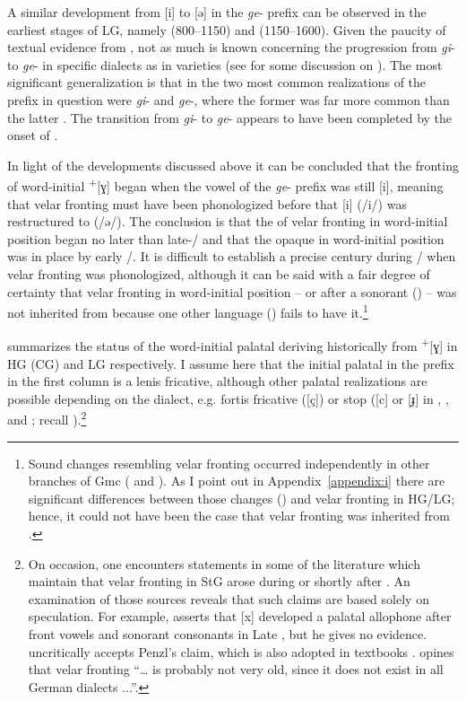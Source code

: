 A similar development from [i] to [ə] in the \textit{ge}{}- prefix can be observed in the earliest stages of LG, namely  (800--1150) and  (1150--1600). Given the paucity of textual evidence from , not as much is known concerning the progression from \textit{gi}{}- to \textit{ge}{}- in specific  dialects as in  varieties (see \citealt{King1965} for some discussion on ). The most significant generalization is that in  the two most common realizations of the prefix in question were \textit{gi}{}- and \textit{ge}{}-, where the former was far more common than the latter \citep[42]{Holthausen1900}. The transition from \textit{gi}{}- to \textit{ge}{}- appears to have been completed by the onset of  \citep[125]{Lasch1914}.

In light of the developments discussed above it can be concluded that the fronting of word-initial  \textsuperscript{+}[ɣ] began when the vowel of the \textit{ge}{}- prefix was still [i], meaning that velar fronting must have been phonologized before that [i] (/i/) was restructured to  (/ə/). The conclusion is that the  of velar fronting in word-initial position began no later than late-/ and that the opaque in word-initial position was in place by early /. It is difficult to establish a precise century during / when velar fronting was phonologized, although it can be said with a fair degree of certainty that velar fronting in word-initial position -- or after a sonorant () -- was not inherited from  because one other  language () fails to have it.\footnote{{Sound changes resembling velar fronting occurred independently in other branches of Gmc ( and ). As I point out in Appendix~\ref{appendix:i} there are significant differences between those changes () and velar fronting in HG/LG; hence, it could not have been the case that velar fronting was inherited from .}}

 summarizes the status of the word-initial palatal deriving historically from  \textsuperscript{+}[ɣ] in HG (CG) and LG respectively. I assume here that the initial palatal in the prefix in the first column is a lenis fricative, although other palatal realizations are possible depending on the dialect, e.g. fortis fricative ([ç]) or stop ([c] or [ɟ] in , , and ; recall ).\footnote{On occasion, one encounters statements in some of the literature which maintain that velar fronting in StG arose during or shortly after . An examination of those sources reveals that such claims are based solely on speculation. For example, \citet[107]{Penzl1975} asserts that [x] developed a palatal allophone after front vowels and sonorant consonants in Late , but he gives no evidence. \citet[63]{Cercignani1979} uncritically accepts Penzl’s claim, which is also adopted in textbooks \citep[288]{Schmidt2007}. \citet[85]{Russ1982} opines that velar fronting “… is probably not very old, since it does not exist in all German dialects ...”.}

